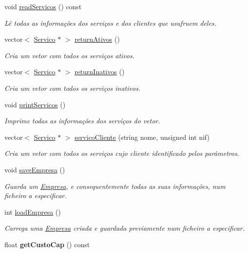 \begin{DoxyCompactItemize}
void \hyperlink{class_empresa_abf38596df14beba52315687b699fe087}{read\+Servicos} () const 
\begin{DoxyCompactList}\small\item\em Lê todas as informações dos serviços e dos clientes que usufruem deles. \end{DoxyCompactList}\item 
vector$<$ \hyperlink{class_servico}{Servico} $\ast$ $>$ \hyperlink{class_empresa_a94550ff669545ff0cd03f85118a63394}{return\+Ativos} ()
\begin{DoxyCompactList}\small\item\em Cria um vetor com todos os serviços ativos. \end{DoxyCompactList}\item 
vector$<$ \hyperlink{class_servico}{Servico} $\ast$ $>$ \hyperlink{class_empresa_ae03b8956798a193ea9140394f744b863}{return\+Inativos} ()
\begin{DoxyCompactList}\small\item\em Cria um vetor com todos os serviços inativos. \end{DoxyCompactList}\item 
void \hyperlink{class_empresa_a29c441849b5df54979d39f5e0c7607e2}{print\+Servicos} ()
\begin{DoxyCompactList}\small\item\em Imprime todas as informações dos serviços do vetor. \end{DoxyCompactList}\item 
vector$<$ \hyperlink{class_servico}{Servico} $\ast$ $>$ \hyperlink{class_empresa_aee257392591e04103105366515815b2c}{servico\+Cliente} (string nome, unsigned int nif)
\begin{DoxyCompactList}\small\item\em Cria um vetor com todos os serviços cujo cliente identificado pelos parâmetros. \end{DoxyCompactList}\item 
void \hyperlink{class_empresa_abafc415ff93409f9f0f66ad6e1bade32}{save\+Empresa} ()
\begin{DoxyCompactList}\small\item\em Guarda um \hyperlink{class_empresa}{Empresa}, e consequentemente todas as suas informações, num ficheiro a especificar. \end{DoxyCompactList}\item 
int \hyperlink{class_empresa_a386b43304a0482047274f95b3442f9ff}{load\+Empresa} ()
\begin{DoxyCompactList}\small\item\em Carrega uma \hyperlink{class_empresa}{Empresa} criada e guardada previamente num ficheiro a especificar. \end{DoxyCompactList}\item 
\hypertarget{class_empresa_a4514b68f6549fa2860e74e788a74a041}{}float {\bfseries get\+Custo\+Cap} () const \label{class_empresa_a4514b68f6549fa2860e74e788a74a041}


\end{DoxyCompactItemize}
